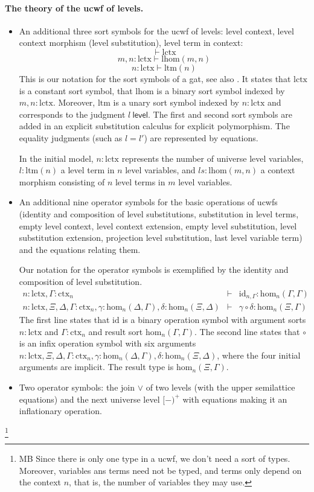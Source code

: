 \documentclass[11pt,a4paper]{article}
\theoremstyle{definition}
\newcommand{\id}{\mathsf{id}}
\newcommand{\level}{\mathsf{level}}
\def\lhom{\mathrm{lhom}}
\def\Hom{\mathrm{hom}}
\def\id{\mathrm{id}}
\def\lctx{\mathrm{lctx}}
\def\ltm{\mathrm{ltm}}
\newcommand{\ctx}{\mathrm{ctx}}
\begin{document}
\paragraph{The theory of the ucwf of levels.}
\begin{itemize}
\item An additional three sort symbols for the ucwf of levels: level context, level context morphism (level substitution), level term in context:
$$
\vdash \lctx
$$
$$
m,n : \lctx \vdash \lhom(m,n)
$$
$$
n : \lctx \vdash  \ltm(n)
$$
This is our notation for the sort symbols of a gat, see also \cite{bezem:hofmann}. It states that $\lctx$ is a constant sort symbol, that $\lhom$ is a binary sort symbol indexed by $m,n : \lctx$. Moreover, $\ltm$ is a unary sort symbol indexed by $n : \lctx$ and corresponds to the judgment $l\ \level$. The first and second sort symbols are added in an explicit substitution calculus for explicit polymorphism. The equality judgments (such as $l = l'$) are represented by equations.  

In the initial model, $n : \lctx$ represents the number of universe level variables, $l : \ltm(n)$ a level term in $n$ level variables, and $ls : \lhom(m,n)$ a context morphism consisting of $n$ level terms in $m$ level variables.

\item An additional nine operator symbols for the basic operations of ucwfs (identity and composition of level substitutions, substitution in level terms, empty level context, level context extension, empty level substitution, level substitution extension, projection level substitution, last level variable term) and the equations relating them.

Our notation for the operator symbols is exemplified by the identity and composition of level substitution.
\begin{eqnarray*}
n : \lctx, \Gamma : \ctx_n &\vdash& \id_{n,\Gamma} : \Hom_n(\Gamma,\Gamma)\\
n : \lctx, \Xi,\Delta,\Gamma : \ctx_n, \gamma : \Hom_n(\Delta,\Gamma), \delta : \Hom_n(\Xi,\Delta) &\vdash&
\gamma \circ \delta : \Hom_n(\Xi,\Gamma)
\end{eqnarray*}
The first line states that $\id$ is a binary operation symbol with argument sorts $n : \lctx$ and  $\Gamma : \ctx_n$ and result sort $\Hom_n(\Gamma,\Gamma)$. The second line states that $\circ$ is an infix operation symbol with six arguments $n : \lctx, \Xi,\Delta,\Gamma : \ctx_n, \gamma : \Hom_n(\Delta,\Gamma), \delta : \Hom_n(\Xi,\Delta)$, where the four initial arguments are implicit. The result type is $\Hom_n(\Xi,\Gamma)$.

\item Two operator symbols: the join $\vee$ of two levels (with the upper semilattice equations) and the next universe level $[-)^+$ with equations making it an inflationary operation.
\end{itemize}
%
\footnote{MB Since there is only one type in a ucwf, we don't need
a sort of types. Moreover, variables ans terms need not be typed, and
terms only depend on the context $n$, that is, the number of variables
they may use.}
\end{document}
